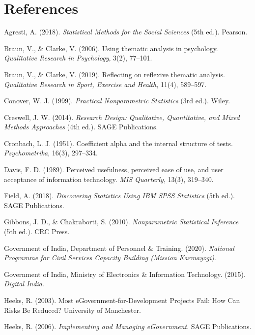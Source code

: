 \documentclass[12pt,a4paper]{article}
\begin{document}
\newpage

\section*{References}

\begin{enumerate}[leftmargin=1.5em, itemsep=4pt, label={[\arabic*]}]
    \item Agresti, A. (2018). \textit{Statistical Methods for the Social Sciences} (5th ed.). Pearson.
    \item Braun, V., \& Clarke, V. (2006). Using thematic analysis in psychology. \textit{Qualitative Research in Psychology}, 3(2), 77--101.
    \item Braun, V., \& Clarke, V. (2019). Reflecting on reflexive thematic analysis. \textit{Qualitative Research in Sport, Exercise and Health}, 11(4), 589--597.
    \item Conover, W. J. (1999). \textit{Practical Nonparametric Statistics} (3rd ed.). Wiley.
    \item Creswell, J. W. (2014). \textit{Research Design: Qualitative, Quantitative, and Mixed Methods Approaches} (4th ed.). SAGE Publications.
    \item Cronbach, L. J. (1951). Coefficient alpha and the internal structure of tests. \textit{Psychometrika}, 16(3), 297--334.
    \item Davis, F. D. (1989). Perceived usefulness, perceived ease of use, and user acceptance of information technology. \textit{MIS Quarterly}, 13(3), 319--340.
    \item Field, A. (2018). \textit{Discovering Statistics Using IBM SPSS Statistics} (5th ed.). SAGE Publications.
    \item Gibbons, J. D., \& Chakraborti, S. (2010). \textit{Nonparametric Statistical Inference} (5th ed.). CRC Press.
    \item Government of India, Department of Personnel \& Training. (2020). \textit{National Programme for Civil Services Capacity Building (Mission Karmayogi)}.
    \item Government of India, Ministry of Electronics \& Information Technology. (2015). \textit{Digital India}.
    \item Heeks, R. (2003). Most eGovernment-for-Development Projects Fail: How Can Risks Be Reduced? University of Manchester.
    \item Heeks, R. (2006). \textit{Implementing and Managing eGovernment}. SAGE Publications.

\end{enumerate}
\end{document}
